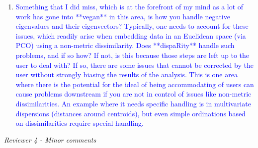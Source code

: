 \documentclass[12pt,letterpaper]{article}
\renewcommand{\subsection}[1]{%
\bigskip
\begin{center}
\begin{large}
\normalfont\itshape #1
\end{large}
\end{center}}
\begin{document}
\begin{enumerate}
\item{\textcolor{blue}{Something that I did miss, which is at the forefront of my mind as a lot of work has gone into **vegan** in this area, is how you handle negative eigenvalues and their eigenvectors?
Typically, one needs to account for these issues, which readily arise when embedding data in an Euclidean space (via PCO) using a non-metric dissimilarity.
Does **dispaRity** handle such problems, and if so how?
If not, is this because those steps are left up to the user to deal with?
If so, there are some issues that cannot be corrected by the user without strongly biasing the results of the analysis.
This is one area where there is the potential for the ideal of being accommodating of users can cause problems downstream if you are not in control of issues like non-metric dissimilarities.
An example where it needs specific handling is in multivariate dispersions (distances around centroids), but even simple ordinations based on dissimilarities require special handling.}}


\end{enumerate}

\subsection{Reviewer 4 - Minor comments}
\end{document}
